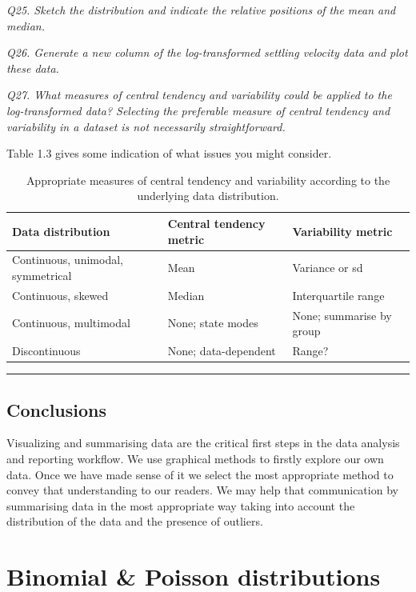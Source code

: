 \documentclass[
  11pt,
  a4paper,
]{book}
\begin{document}
\emph{Q25. Sketch the distribution and indicate the relative positions of the mean and median.}

\emph{Q26. Generate a new column of the log-transformed settling velocity data and plot these data.}

\emph{Q27. What measures of central tendency and variability could be applied to the log-transformed data? Selecting the preferable measure of central tendency and variability in a dataset is not necessarily straightforward.}

Table 1.3 gives some indication of what issues you might consider.

\begin{table}

\caption{\label{tab:metric-table}Appropriate measures of central tendency and variability according to the underlying data distribution.}
\centering
\begin{tabular}[t]{lll}
\toprule
Data distribution & Central tendency metric & Variability metric\\
\midrule
Continuous,
unimodal,
symmetrical & Mean & Variance or sd\\
Continuous, skewed & Median & Interquartile range\\
Continuous,
multimodal & None; state modes & None; summarise by
group\\
Discontinuous & None; data-dependent & Range?\\
\bottomrule
\end{tabular}
\end{table}

\begin{center}\rule{0.5\linewidth}{0.5pt}\end{center}

\hypertarget{conclusions}{%
\section{Conclusions}\label{conclusions}}

Visualizing and summarising data are the critical first steps in the data analysis and reporting workflow. We use graphical methods to firstly explore our own data. Once we have made sense of it we select the most appropriate method to convey that understanding to our readers. We may help that communication by summarising data in the most appropriate way taking into account the distribution of the data and the presence of outliers.

\hypertarget{binpois}{%
\chapter{Binomial \& Poisson distributions}\label{binpois}}
\end{document}
